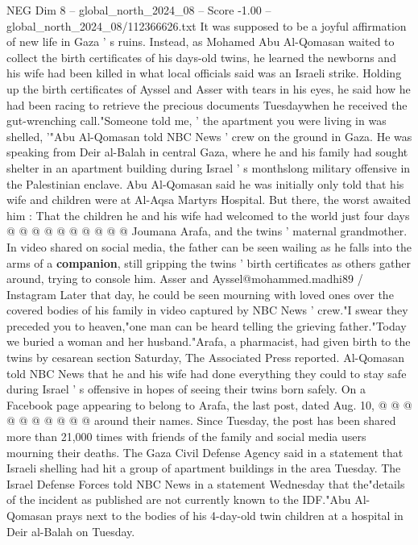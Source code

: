 \begin{textsample}{NEG Dim 8 – global\_north\_2024\_08 – Score -1.00 – global\_north\_2024\_08/112366626.txt}  \label{ex:f8_neg_423}
It was supposed to be a joyful affirmation of new life in Gaza ' s ruins.
Instead, as Mohamed Abu Al-Qomasan waited to collect the birth certificates of his days-old twins, he learned the newborns and his wife had been killed in what local officials said was an Israeli strike.
Holding up the birth certificates of Ayssel and Asser with tears in his eyes, he said how he had been racing to retrieve the precious documents Tuesdaywhen he received the gut-wrenching call."Someone told me, ' the apartment you were living in was shelled, '"Abu Al-Qomasan told NBC News ' crew on the ground in Gaza.
He was speaking from Deir al-Balah in central Gaza, where he and his family had sought shelter in an apartment building during Israel ' s monthslong military offensive in the Palestinian enclave.
Abu Al-Qomasan said he was initially only told that his wife and children were at Al-Aqsa Martyrs Hospital.
But there, the worst awaited him : That the children he and his wife had welcomed to the world just four days @ @ @ @ @ @ @ @ @ @ Joumana Arafa, and the twins ' maternal grandmother.
In video shared on social media, the father can be seen wailing as he falls into the arms of a \textbf{companion}, still gripping the twins ' birth certificates as others gather around, trying to console him.
Asser and Ayssel@mohammed.madhi89 / Instagram Later that day, he could be seen mourning with loved ones over the covered bodies of his family in video captured by NBC News ' crew."I swear they preceded you to heaven,"one man can be heard telling the grieving father."Today we buried a woman and her husband."Arafa, a pharmacist, had given birth to the twins by cesarean section Saturday, The Associated Press reported.
Al-Qomasan told NBC News that he and his wife had done everything they could to stay safe during Israel ' s offensive in hopes of seeing their twins born safely.
On a Facebook page appearing to belong to Arafa, the last post, dated Aug. 10, @ @ @ @ @ @ @ @ @ @ around their names.
Since Tuesday, the post has been shared more than 21,000 times with friends of the family and social media users mourning their deaths.
The Gaza Civil Defense Agency said in a statement that Israeli shelling had hit a group of apartment buildings in the area Tuesday.
The Israel Defense Forces told NBC News in a statement Wednesday that the"details of the incident as published are not currently known to the IDF."Abu Al-Qomasan prays next to the bodies of his 4-day-old twin children at a hospital in Deir al-Balah on Tuesday.

\end{textsample}
